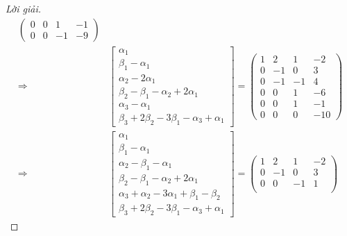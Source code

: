 \documentclass[class=linearalgebra,crop=false]{standalone}
\begin{document}
\begin{proof}[Lời giải]
\begin{align*}
\begin{pmatrix}
            0 & 0  & 1  & -1 \\
            0 & 0  & -1 & -9
        \end{pmatrix}                    \\
        \Longrightarrow &
        \begin{bmatrix}
            \alpha_{1}                                       \\
            \beta_{1} - \alpha_{1}                           \\
            \alpha_{2} - 2\alpha_{1}                         \\
            \beta_{2} - \beta_{1} - \alpha_{2} + 2\alpha_{1} \\
            \alpha_{3} - \alpha_{1}                          \\
            \beta_{3} + 2\beta_{2} - 3\beta_{1} - \alpha_{3} + \alpha_{1}
        \end{bmatrix}=
        \begin{pmatrix}
            1 & 2  & 1  & -2  \\
            0 & -1 & 0  & 3   \\
            0 & -1 & -1 & 4   \\
            0 & 0  & 1  & -6  \\
            0 & 0  & 1  & -1  \\
            0 & 0  & 0  & -10
        \end{pmatrix}                    \\
        \Longrightarrow &
        \begin{bmatrix}
            \alpha_{1}                                                    \\
            \beta_{1} - \alpha_{1}                                        \\
            \alpha_{2} - \beta_{1} - \alpha_{1}                           \\
            \beta_{2} - \beta_{1} - \alpha_{2} + 2\alpha_{1}              \\
            \alpha_{3} + \alpha_{2} - 3\alpha_{1} + \beta_{1} - \beta_{2} \\
            \beta_{3} + 2\beta_{2} - 3\beta_{1} - \alpha_{3} + \alpha_{1}
        \end{bmatrix}=
        \begin{pmatrix}
            1 & 2  & 1  & -2  \\
            0 & -1 & 0  & 3   \\
            0 & 0  & -1 & 1   \\

\end{pmatrix}
\end{align*}
\end{proof}
\end{document}
